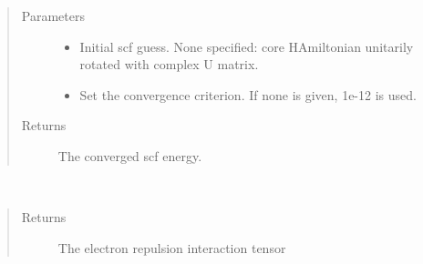 \documentclass[letterpaper,10pt,english]{sphinxmanual}
\begin{document}
\begin{fulllineitems}
\begin{fulllineitems}
\begin{sphinxVerbatim}[commandchars=\\\{\}]
          
   
  
\end{sphinxVerbatim}
\begin{quote}\begin{description}
\item[{Parameters}] \leavevmode\begin{itemize}
\item {} 
 \textendash{} Initial scf guess. None specified: core HAmiltonian unitarily rotated with complex U matrix.

\item {} 
 \textendash{} Set the convergence criterion. If none is given, 1e-12 is used.

\end{itemize}

\item[{Returns}] \leavevmode
The converged scf energy.

\end{description}\end{quote}

\end{fulllineitems}


\begin{fulllineitems}
\label{\detokenize{Complex_GHF:ghf.complex_GHF.ComplexGHF.get_two_e}}~\begin{quote}\begin{description}
\item[{Returns}] \leavevmode
The electron repulsion interaction tensor


\end{description}
\end{quote}
\end{fulllineitems}
\end{fulllineitems}
\end{document}
